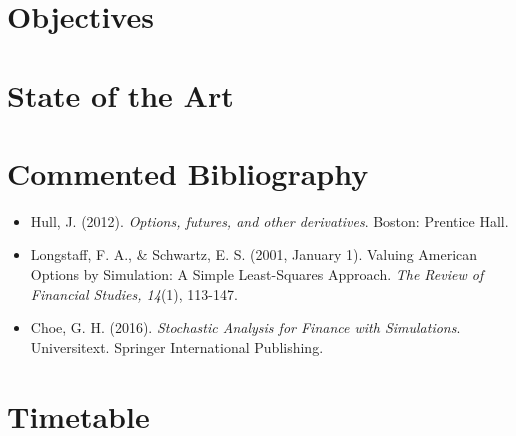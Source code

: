 \documentclass[a4paper,prd,twocolumn,nofootinbib,superscriptaddress,floatfix]{revtex4}
\begin{document}
\section{Objectives}

\section{State of the Art}

\section{Commented Bibliography}
\begin{itemize}
\item Hull, J. (2012). \textit{Options, futures, and other derivatives}. Boston: Prentice Hall.

\item Longstaff, F. A., \& Schwartz, E. S. (2001, January 1). Valuing American Options by Simulation: A Simple Least-Squares Approach. \textit{The Review of Financial Studies, 14}(1), 113-147.

\item Choe, G. H. (2016). \textit{Stochastic Analysis for Finance with Simulations}. Universitext. Springer International Publishing. 
\end{itemize}
\section{Timetable}

\iffalse
\section{Thesis Supervisors}
\begin{itemize}
  \item Cláudia Nunes Philippart, \ \ cnunes@math.tecnico.ulisboa.pt
  \item Rui Manuel Agostinho Dilão, \ \ ruidilao@tecnico.ulisboa.pt
  \item Claude Yves Cochet, \ \ claude.cochet@bnpparibas.com
\end{itemize}
\fi
\end{document}
